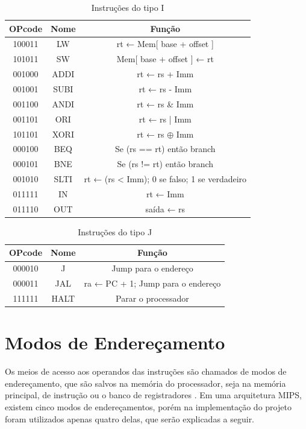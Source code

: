 \documentclass[
	12pt,				%
	oneside,
	a4paper,			%
	english,			%
	french,				%
	spanish,			%
	brazil,				%
	]{abntex2}
\begin{document}
\begin{table}[H]
\centering
\ABNTEXfontereduzida
\caption{Instruções do tipo I} \label{tab:InstrI}
\begin{tabular}{||c c c||} 
 \hline
 OPcode &  Nome & Função \\ [0.5ex] 
 \hline\hline
 100011 & LW & rt ← Mem[ base + offset ]  \\ 
 \hline
 101011 & SW & Mem[ base + offset ] ← rt \\
 \hline
 001000 & ADDI & rt ← rs + Imm \\
 \hline
 001001 & SUBI & rt ← rs - Imm \\
 \hline
 001100 & ANDI & rt ← rs \& Imm \\
 \hline
 001101 & ORI & rt ← rs | Imm \\
 \hline
 101101 & XORI & rt ← rs $\oplus$ Imm \\
 \hline
 000100 & BEQ & Se (rs == rt) então branch  \\  
 \hline
 000101 & BNE & Se (rs != rt) então branch \\  
 \hline
 001010 & SLTI & rt ← (rs < Imm); 0 se falso; 1 se verdadeiro \\ 
 \hline
 011111 & IN & rt ← Imm \\
 \hline
 011110 & OUT & saída ← rs \\
 \hline
\end{tabular}
\end{table}

\begin{table}[H]
\centering
\ABNTEXfontereduzida
\caption{Instruções do tipo J} \label{tab:InstrJ}
\begin{tabular}{||c c c||} 
 \hline
 OPcode & Nome & Função \\ [0.5ex] 
 \hline\hline
 000010 & J & Jump para o endereço \\ 
 \hline
 000011 & JAL & ra ← PC + 1; Jump para o endereço \\
 \hline
 111111 & HALT & Parar o processador \\
 \hline
\end{tabular}
\end{table}

\section{Modos de Endereçamento}
Os meios de acesso aos operandos das instruções são chamados de modos de endereçamento, que são salvos na memória do processador, seja na memória principal, de instrução ou o banco de registradores \cite{patterson2006}. Em uma arquitetura MIPS, existem cinco modos de endereçamentos, porém na implementação do projeto foram utilizados apenas quatro delas, que serão explicadas a seguir.
	
\end{document}
